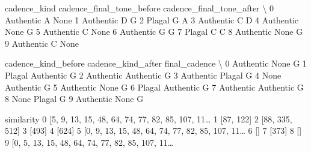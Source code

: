 \documentclass[letterpaper,10pt,english]{sphinxmanual}
\begin{document}
{\begin{sphinxVerbatim}[commandchars=\\\{\}]
  cadence\_kind cadence\_final\_tone\_before cadence\_final\_tone\_after  \textbackslash{}
0    Authentic                         A                     None
1    Authentic                         D                        G
2       Plagal                         G                        A
3    Authentic                         C                        D
4    Authentic                      None                        G
5    Authentic                         C                     None
6    Authentic                         G                        G
7       Plagal                         C                        C
8    Authentic                      None                        G
9    Authentic                         C                     None

  cadence\_kind\_before cadence\_kind\_after final\_cadence  \textbackslash{}
0           Authentic               None             G
1              Plagal          Authentic             G
2           Authentic          Authentic             G
3           Authentic             Plagal             G
4                None          Authentic             G
5           Authentic               None             G
6              Plagal          Authentic             G
7           Authentic          Authentic             G
8                None             Plagal             G
9           Authentic               None             G

                                          similarity
0  [5, 9, 13, 15, 48, 64, 74, 77, 82, 85, 107, 11{\ldots}
1                                          [87, 122]
2                                     [88, 335, 512]
3                                              [493]
4                                              [624]
5  [0, 9, 13, 15, 48, 64, 74, 77, 82, 85, 107, 11{\ldots}
6                                                 []
7                                              [373]
8                                                 []
9  [0, 5, 13, 15, 48, 64, 74, 77, 82, 85, 107, 11{\ldots}
\end{sphinxVerbatim}
}
\end{document}
